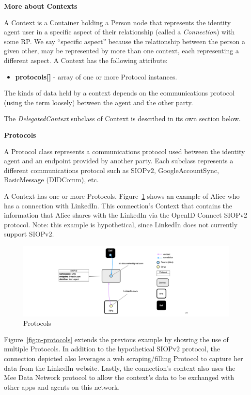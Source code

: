 \documentclass[11pt, oneside]{article}   	%
\begin{document}
\textbf{More about Contexts}

A Context is a Container holding a Person node that represents the identity agent user in a specific aspect of their relationship (called a \emph{Connection}) with some RP. We say ``specific aspect'' because the relationship between the person a given other, may be represented by more than one context, each representing a different aspect. A Context has the following attribute:

\begin{itemize}
\item \textbf{protocols[]} - array of one or more Protocol instances.
\end{itemize}

The kinds of data held by a context depends on the communications protocol (using the term loosely) between the agent and the other party. 

The \emph{DelegatedContext} subclass of Context is described in its own section below.

\textbf{Protocols}

A Protocol class represents a communications protocol used between the identity agent and an endpoint provided by another party. Each subclass represents a different communications protocol such as SIOPv2, GoogleAccountSync, BasicMessage (DIDComm), etc.  

A Context has one or more Protocols. Figure~\ref{fig:protocol} shows an example of Alice who has a connection with LinkedIn. This connection's Context that contains the information that Alice shares with the LinkedIn via the OpenID Connect SIOPv2 protocol. Note: this example is hypothetical, since LinkedIn does not currently support SIOPv2.

\begin{figure}[htbp]
	\includegraphics[width=\textwidth]{./images/context-with-protocol.png}
	\caption{Protocols}
	\label{fig:protocol}
\end{figure}

Figure~\ref{fig:n-protocols} extends the previous example by showing the use of multiple Protocols. In addition to the hypothetical SIOPv2 protocol, the connection depicted also leverages a web scraping/filling Protocol to capture her data from the LinkedIn website. Lastly, the connection's context also uses the Mee Data Network protocol to allow the context's data to be exchanged with other apps and agents on this  network. 
\end{document}
